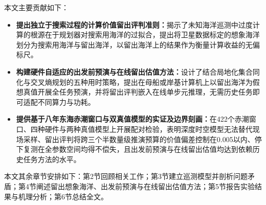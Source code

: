 本文主要贡献如下：
\begin{itemize}
  \item \textbf{提出独立于搜索过程的计算价值留出评判准则：}揭示了未知海洋巡测中过度计算的根源在于规划器对搜索用海洋的过拟合，提出将卫星数据标定的想象海洋划分为搜索用海洋与留出海洋，以留出海洋上的结果作为衡量计算收益的无偏标尺。
  \item \textbf{构建硬件自适应的出发前预演与在线留出估值方法：}设计了结合局地化集合同化与交叉熵规划的五种用时策略，提出在母船或岸基计算机上以留出海洋为假想真值开展全任务预演，并将留出评判嵌入在线单步元推理，无需历史任务即可适配不同算力与功耗。
  \item \textbf{提供基于八年东海赤潮窗口与双真值模型的实证及边界刻画：}在422个赤潮窗口、四种硬件与两种真值模型上开展配对检验，表明深度时空模型无法替代现场采样、留出评判将跨三个半数量级推演预算的价值偏差控制在0.005以内、停下复测在全参数空间均得不偿失，且出发前预演与在线留出估值均达到依赖历史任务方法的水平。
\end{itemize}

本文其余章节安排如下：第2节回顾相关工作；第3节建立巡测模型并剖析问题矛盾；第4节阐述留出想象海洋、出发前预演与在线留出估值方法；第5节报告实验结果与机理分析；第6节总结全文。
